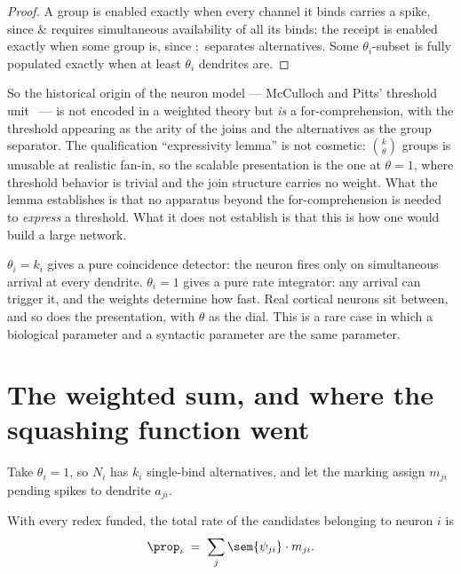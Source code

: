 \begin{proof}
A group is enabled exactly when every channel it binds carries a spike, since $\&$
requires simultaneous availability of all its binds; the receipt is enabled exactly when
some group is, since $;$ separates alternatives. Some $\theta_i$-subset is fully
populated exactly when at least $\theta_i$ dendrites are.
\end{proof}

So the historical origin of the neuron model --- McCulloch and Pitts' threshold
unit~\cite{mcp} --- is not encoded in a weighted theory but \emph{is} a
for-comprehension, with the threshold appearing as the arity of the joins and the
alternatives as the group separator. The qualification ``expressivity lemma'' is not
cosmetic: $\binom{k}{\theta}$ groups is unusable at realistic fan-in, so the scalable
presentation is the one at $\theta = 1$, where threshold behavior is trivial and the
join structure carries no weight. What the lemma establishes is that no apparatus beyond
the for-comprehension is needed to \emph{express} a threshold. What it does not establish
is that this is how one would build a large network.

\begin{remark}
\label{spk:rmk:dial}
$\theta_i = k_i$ gives a pure coincidence detector: the neuron fires only on simultaneous
arrival at every dendrite. $\theta_i = 1$ gives a pure rate integrator: any arrival can
trigger it, and the weights determine how fast. Real cortical neurons sit between, and so
does the presentation, with $\theta$ as the dial. This is a rare case in which a
biological parameter and a syntactic parameter are the same parameter.
\end{remark}

\section{The weighted sum, and where the squashing function went}
\label{spk:sec:squash}

Take $\theta_i = 1$, so $N_i$ has $k_i$ single-bind alternatives, and let the marking
assign $m_{ji}$ pending spikes to dendrite $a_{ji}$.

\begin{proposition}
\label{spk:prop:sum}
With every redex funded, the total rate of the candidates belonging to neuron $i$ is
\[
  \prop_i \;=\; \sum_j \sem{\psi_{ji}} \cdot m_{ji} .
\]
\end{proposition}

